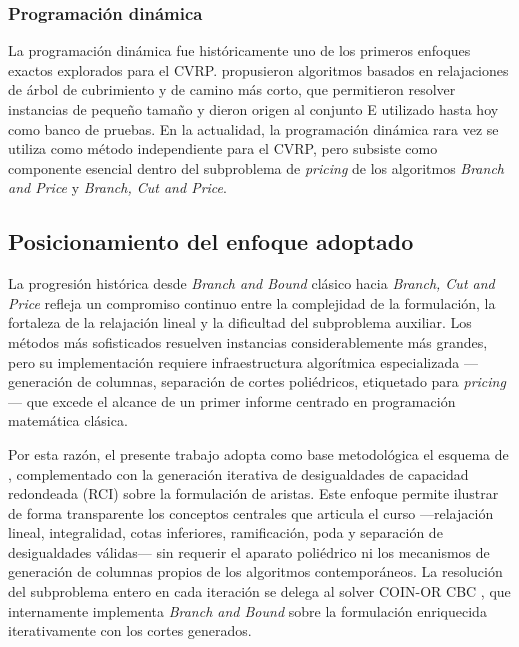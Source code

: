\subsubsection{Programación dinámica}

La programación dinámica fue históricamente uno de los primeros enfoques exactos
explorados para el CVRP. \textcite{christofides1981exact} propusieron algoritmos
basados en relajaciones de árbol de cubrimiento y de camino más corto, que permitieron
resolver instancias de pequeño tamaño y dieron origen al conjunto E utilizado hasta hoy
como banco de pruebas. En la actualidad, la programación dinámica rara vez se utiliza
como método independiente para el CVRP, pero subsiste como componente esencial dentro
del subproblema de \textit{pricing} de los algoritmos \textit{Branch and Price} y
\textit{Branch, Cut and Price}.

\subsection{Posicionamiento del enfoque adoptado}

La progresión histórica desde \textit{Branch and Bound} clásico hacia
\textit{Branch, Cut and Price} refleja un compromiso continuo entre la complejidad de la
formulación, la fortaleza de la relajación lineal y la dificultad del subproblema
auxiliar. Los métodos más sofisticados resuelven instancias considerablemente más
grandes, pero su implementación requiere infraestructura algorítmica especializada
—generación de columnas, separación de cortes poliédricos, etiquetado para
\textit{pricing}— que excede el alcance de un primer informe centrado en programación
matemática clásica.

Por esta razón, el presente trabajo adopta como base metodológica el esquema de
\textcite{laporte1983branch}, complementado con la generación iterativa de
desigualdades de capacidad redondeada (RCI) sobre la formulación de aristas. Este
enfoque permite ilustrar de forma transparente los conceptos centrales que articula el
curso —relajación lineal, integralidad, cotas inferiores, ramificación, poda y
separación de desigualdades válidas— sin requerir el aparato poliédrico ni los
mecanismos de generación de columnas propios de los algoritmos contemporáneos. La
resolución del subproblema entero en cada iteración se delega al solver
COIN-OR CBC \parencite{pulp2011}, que internamente implementa \textit{Branch and Bound}
sobre la formulación enriquecida iterativamente con los cortes generados.

